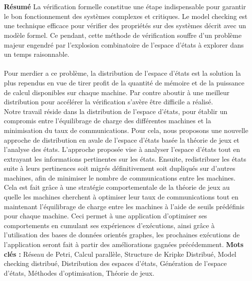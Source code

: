 \chapter*{}
\begin{changemargin}{3mm}{0cm}
    \begin{minipage}[c]{0.96\columnwidth}        

        
        {\LARGE\textbf{Résumé}}
        \vskip1mm
            \begingroup
                La vérification formelle constitue une étape indispensable pour garantir le bon fonctionnement des systèmes complexes et critiques. Le model checking est une technique efficace pour vérifier des propriétés sur des systèmes décrit avec un modèle formel. Ce pendant, cette méthode de vérification souffre d'un problème majeur engendré par l'explosion combinatoire de l'espace d'états à explorer  dans un temps raisonnable.
                \\\\
                Pour merdier a ce problème, la distribution de l'espace d'états est la solution la plus rependus  en vue de tirer profit de la quantité de mémoire et de la puissance de calcul disponibles sur chaque machine. Par contre aboutir à une meilleur distribution pour accélérer la vérification s'avère être difficile a réalisé.\\
                
                Notre travail réside dans la distribution de l'espace d'états, pour établir un compromis entre l’équilibrage de charge des différentes machines et la minimisation du taux de communications. Pour cela, nous proposons une nouvelle approche de distribution en avale de l'espace d'états basée la théorie de jeux et l'analyse des états. L’approche proposée vise à analyser l'espace d’états tout en extrayant les informations pertinentes sur les états. Ensuite, redistribuer les états suite à leurs pertinences soit migrés définitivement soit dupliqués sur d’autres machines, afin de minimiser le nombre de communications entre les machines. Cela est fait grâce à une stratégie comportementale de la théorie de jeux au quelle les machines cherchent à optimiser leur taux de communications tout en maintenant l'équilibrage de charge entre les machines à l’aide de seuils prédéfinis pour chaque machine. Ceci permet à une application d'optimiser ses comportements en cumulant ses expériences d’exécutions, ainsi grâce à l'utilisation des bases de données orientés graphes, les prochaines exécutions de l’application seront fait à partir des améliorations gagnées précédemment.
            \endgroup
        \vskip1mm
        {\textbf{Mots clés : }
            \begingroup
                Réseau de Petri, Calcul parallèle, Structure de Kripke Distribué, Model checking distribué, Distribution des espaces d'états, 
                Génération de l’espace d’états, Méthodes d’optimisation, Théorie de jeux.
            \endgroup
        }
    \end{minipage}    
\end{changemargin}
\break
        
